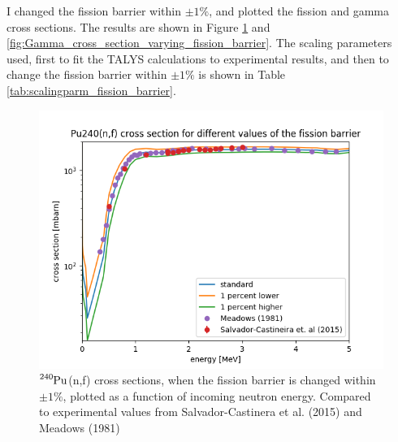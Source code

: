 \documentclass[]{article}
\begin{document}
 \noindent I changed the fission barrier within $\pm 1 \%$, and plotted the fission and gamma cross sections. The results are shown in Figure \ref{fig:Fission_cross_section_varying_fission_barrier} and \ref{fig:Gamma_cross_section_varying_fission_barrier}. The scaling parameters used, first to fit the TALYS calculations to experimental results, and then to change the fission barrier within $\pm 1 \%$ is shown in Table \ref{tab:scalingparm_fission_barrier}. 

  \begin{figure} [H]
	\centering
	\includegraphics[scale=0.7]{Fission_cross_section_varying_fission_barrier.png}
	\caption{ $\ce{^{240}Pu}$(n,f) cross sections, when the fission barrier is changed within $\pm 1 \%$, plotted as a function of incoming neutron energy. Compared to experimental values from Salvador-Castinera et al. (2015) \cite{SALVADORCASTINEIRA2015177} and Meadows (1981) \cite{Meadows198}}
	\label{fig:Fission_cross_section_varying_fission_barrier}
\end{figure}
\end{document}
